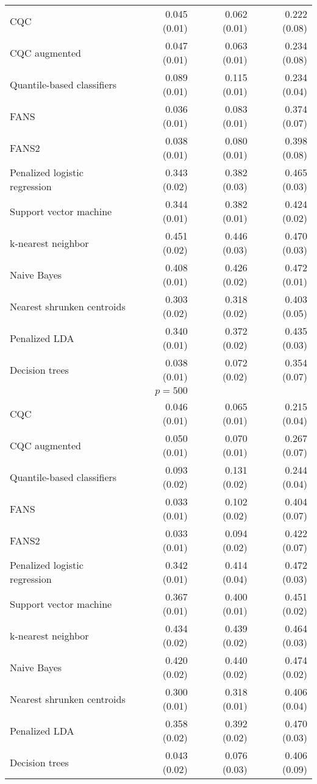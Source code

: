 \begin{table}[p]
\begin{adjustbox}{max size={\textwidth}{10cm}}
\begin{tabular}{l@{\extracolsep{15mm}}rrr}
      CQC & 0.045 (0.01) & 0.062 (0.01) & 0.222 (0.08) \\ 
      CQC augmented & 0.047 (0.01) & 0.063 (0.01) & 0.234 (0.08) \\ 
      Quantile-based classifiers & 0.089 (0.01) & 0.115 (0.01) & 0.234 (0.04) \\ 
      FANS  & 0.036 (0.01) & 0.083 (0.01) & 0.374 (0.07) \\
      FANS2 & 0.038 (0.01) & 0.080 (0.01) & 0.398 (0.08) \\
      Penalized logistic regression & 0.343 (0.02) & 0.382 (0.03) & 0.465 (0.03) \\ 
      Support vector machine & 0.344 (0.01) & 0.382 (0.01) & 0.424 (0.02) \\ 
      k-nearest neighbor & 0.451 (0.02) & 0.446 (0.03) & 0.470 (0.03) \\ 
      Naive Bayes & 0.408 (0.01) & 0.426 (0.02) & 0.472 (0.01) \\ 
      Nearest shrunken centroids & 0.303 (0.02) & 0.318 (0.02) & 0.403 (0.05) \\ 
      Penalized LDA & 0.340 (0.01) & 0.372 (0.02) & 0.435 (0.03) \\ 
      Decision trees & 0.038 (0.01) & 0.072 (0.02) & 0.354 (0.07) \\ [2ex]

      \hline
      & $p = 500$ \\
      \hline

      CQC & 0.046 (0.01) & 0.065 (0.01) & 0.215 (0.04) \\ 
      CQC augmented & 0.050 (0.01) & 0.070 (0.01) & 0.267 (0.07) \\ 
      Quantile-based classifiers & 0.093 (0.02) & 0.131 (0.02) & 0.244 (0.04) \\ 
      FANS  & 0.033 (0.01) & 0.102 (0.02) & 0.404 (0.07) \\
      FANS2 & 0.033 (0.01) & 0.094 (0.02) & 0.422 (0.07) \\
      Penalized logistic regression & 0.342 (0.01) & 0.414 (0.04) & 0.472 (0.03) \\ 
      Support vector machine & 0.367 (0.01) & 0.400 (0.01) & 0.451 (0.02) \\ 
      k-nearest neighbor & 0.434 (0.02) & 0.439 (0.02) & 0.464 (0.03) \\ 
      Naive Bayes & 0.420 (0.02) & 0.440 (0.02) & 0.474 (0.02) \\ 
      Nearest shrunken centroids & 0.300 (0.01) & 0.318 (0.01) & 0.406 (0.04) \\ 
      Penalized LDA & 0.358 (0.02) & 0.392 (0.02) & 0.470 (0.03) \\ 
      Decision trees & 0.043 (0.02) & 0.076 (0.03) & 0.406 (0.09) \\ 

      \hline
      
    \end{tabular}
  \end{adjustbox}
\end{table}




